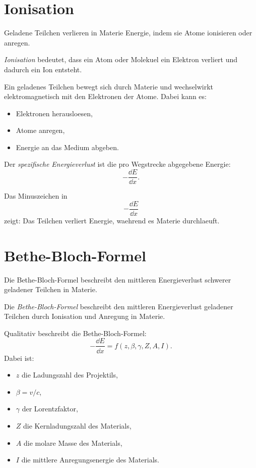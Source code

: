 \section{Ionisation}

Geladene Teilchen verlieren in Materie Energie, indem sie Atome ionisieren oder anregen.

\begin{definitionbox}
\emph{Ionisation} bedeutet, dass ein Atom oder Molekuel ein Elektron verliert und
dadurch ein Ion entsteht.
\end{definitionbox}

\begin{conceptbox}
Ein geladenes Teilchen bewegt sich durch Materie und wechselwirkt elektromagnetisch
mit den Elektronen der Atome.
Dabei kann es:
\begin{itemize}
    \item Elektronen herausloesen,
    \item Atome anregen,
    \item Energie an das Medium abgeben.
\end{itemize}
\end{conceptbox}

\begin{definitionbox}
Der \emph{spezifische Energieverlust} ist die pro Wegstrecke abgegebene Energie:
\[
    -\frac{\dd E}{\dd x}.
\]
\end{definitionbox}

\begin{examtipbox}
Das Minuszeichen in
\[
    -\frac{\dd E}{\dd x}
\]
zeigt:
Das Teilchen verliert Energie, waehrend es Materie durchlaeuft.
\end{examtipbox}

\section{Bethe-Bloch-Formel}

Die Bethe-Bloch-Formel beschreibt den mittleren Energieverlust schwerer geladener
Teilchen in Materie.

\begin{definitionbox}
Die \emph{Bethe-Bloch-Formel} beschreibt den mittleren Energieverlust geladener
Teilchen durch Ionisation und Anregung in Materie.
\end{definitionbox}

\begin{formulabox}
Qualitativ beschreibt die Bethe-Bloch-Formel:
\[
    -\frac{\dd E}{\dd x}
    =
    f(z,\beta,\gamma,Z,A,I).
\]
Dabei ist:
\begin{itemize}
    \item $z$ die Ladungszahl des Projektils,
    \item $\beta=v/c$,
    \item $\gamma$ der Lorentzfaktor,
    \item $Z$ die Kernladungszahl des Materials,
    \item $A$ die molare Masse des Materials,
    \item $I$ die mittlere Anregungsenergie des Materials.
\end{itemize}
\end{formulabox}

